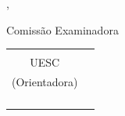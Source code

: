 %
%
\makeatletter
\begin{folhadeaprovacao}

	\begin{center}
		{\large\normalfont\scshape\textbf\imprimirautor}
	\end{center}

	\vspace*{50pt}

	\begin{center}
		\ABNTEXchapterfont\Large\scshape\imprimirtitulo
		\abntex@ifnotempty{\imprimirsubtitulo}{
			{\ABNTEXchapterfont\Large\scshape{\hspace*{-0.3em}: }}{\ABNTEXchapterfont\large\scshape\imprimirsubtitulo}
		}
	\end{center}

	\vspace*{30pt}

%

	\begin{center}
		\imprimirlocal, \imprimirdatadefesa
		\end{center}
		
		\vspace*{7pt}
		\begin{center}
		Comissão Examinadora
		\end{center}
\vspace{-2pt}
\begin{center}
\begin{tabular}{cc}
	\assinatura{\textbf{\imprimirorientador} \\ UESC\\ (Orientadora)}&\\
	\assinatura{\textbf{\imprimirbancamembrointerno} \\ \imprimirbancainstmembrointerno} &\\
	\assinatura{\textbf{\imprimirbancamembroexterno} \\ \imprimirbancainstmembroexterno}&\\
	

\end{tabular}
\end{center}
\end{folhadeaprovacao}
